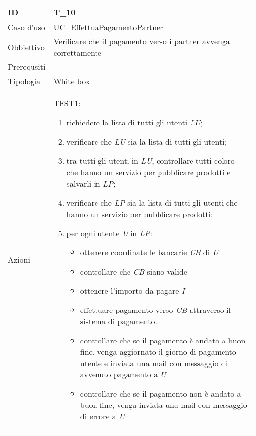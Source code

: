 \begin{table}[hb]
    \centering
    \begin{tabular}{ |p{2cm}|p{10cm}|  }
        \hline
        ID & T\_10 \\\hline
        Caso d'uso & UC\_EffettuaPagamentoPartner \\\hline   
        Obbiettivo & Verificare che il pagamento verso i partner avvenga correttamente \\\hline
        Prerequsiti & - \\\hline
        Tipologia & White box \\\hline
        Azioni & 
        TEST1:
        \begin{enumerate}[topsep=0pt]
            \item richiedere la lista di tutti gli utenti \emph{LU};
            \item verificare che \emph{LU} sia la lista di tutti gli utenti;
            \item tra tutti gli utenti in \emph{LU}, controllare tutti coloro che 
            hanno un servizio per pubblicare prodotti e salvarli in \emph{LP};
            \item verificare che \emph{LP} sia la lista di tutti gli utenti che
            hanno un servizio per pubblicare prodotti;
            \item per ogni utente \emph{U} in \emph{LP}:
            \begin{itemize}
                \item ottenere coordinate le bancarie \emph{CB} di \emph{U}
                \item controllare che \emph{CB} siano valide
                \item ottenere l'importo da pagare \emph{I}
                \item effettuare pagamento verso \emph{CB} attraverso il sistema
                di pagamento.
                \item controllare che se il pagamento è andato a buon fine, venga aggiornato il giorno di 
                pagamento utente e inviata una mail con messaggio di avvenuto pagamento a \emph{U}
                \item controllare che se il pagamento non è andato a buon fine, venga inviata una mail
                con messaggio di errore a \emph{U}
            \end{itemize}

        \end{enumerate}
        \\\hline
    \end{tabular}
\end{table}


